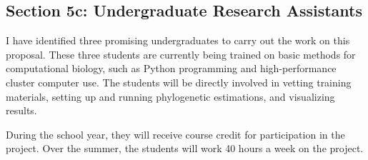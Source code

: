 \documentclass[]{article}
\begin{document}
\subsection*{Section 5c: Undergraduate Research Assistants}

I have identified three promising undergraduates to carry out the work on this proposal. 
These three students are currently being trained on basic methods for computational biology, such as Python programming and high-performance cluster computer use.
The students will be directly involved in vetting training materials, setting up and running phylogenetic estimations, and visualizing results. \par
During the school year, they will receive course credit for participation in the project.
Over the summer, the students will work 40 hours a week on the project. \par
\end{document}
